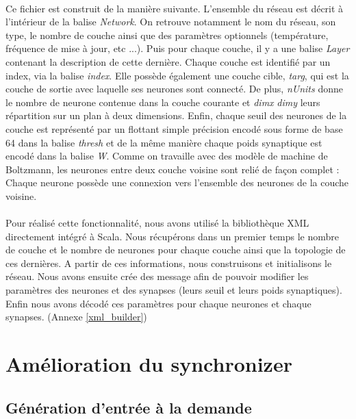\documentclass[a4paper,10pt]{article}
\begin{document}
\paragraph{}
Ce fichier est construit de la manière suivante. L'ensemble du réseau est décrit à l'intérieur de la balise \emph{Network}. On retrouve notamment le nom du réseau, son type, le nombre de couche ainsi que des paramètres optionnels (température, fréquence de mise à jour, etc ...). Puis pour chaque couche, il y a une balise \emph{Layer} contenant la description de cette dernière. Chaque couche est identifié par un index, via la balise \emph{index}. Elle possède également une couche cible, \emph{targ}, qui est la couche de sortie avec laquelle ses neurones sont connecté. De plus, \emph{nUnits} donne le nombre de neurone contenue dans la couche courante et \emph{dimx} \emph{dimy} leurs répartition sur un plan à deux dimensions. Enfin, chaque seuil des neurones de la couche est représenté par un flottant simple précision encodé sous forme de base 64 dans la balise \emph{thresh} et de la même manière chaque poids synaptique est encodé dans la balise \emph{W}. Comme on travaille avec des modèle de machine de Boltzmann, les neurones entre deux couche voisine sont relié de façon complet : Chaque neurone possède une connexion vers l'ensemble des neurones de la couche voisine.

\paragraph{}
Pour réalisé cette fonctionnalité, nous avons utilisé la bibliothèque XML directement intégré à Scala. Nous récupérons dans un premier temps le nombre de couche et le nombre de neurones pour chaque couche ainsi que la topologie de ces dernières. A partir de ces informations, nous construisons et initialisons le réseau. Nous avons ensuite crée des message afin de pouvoir modifier les paramètres des neurones et des synapses (leurs seuil et leurs poids synaptiques). Enfin nous avons décodé ces paramètres pour chaque neurones et chaque synapses. (Annexe \ref{xml_builder})

\section{Amélioration du synchronizer}

\subsection{Génération d'entrée à la demande}
\end{document}
